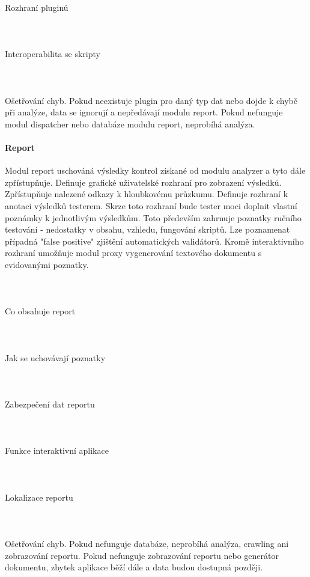 \documentclass[10pt]{article}
\begin{document}
	\paragraph{~}Rozhraní pluginů
	\paragraph{~}Interoperabilita se skripty
	\paragraph{~}Ošetřování chyb. Pokud neexistuje plugin pro daný typ dat nebo dojde k chybě při analýze, data se ignorují a nepředávají modulu report. Pokud nefunguje modul dispatcher nebo databáze modulu report, neprobíhá analýza.
	\paragraph{Report} Modul report uschováná výsledky kontrol získané od modulu analyzer a tyto dále zpřístupňuje. Definuje grafické uživatelské rozhraní pro zobrazení výsledků. Zpřístupňuje nalezené odkazy k hloubkovému průzkumu. Definuje rozhraní k anotaci výsledků testerem. Skrze toto rozhraní bude tester moci doplnit vlastní poznámky k jednotlivým výsledkům. Toto především zahrnuje poznatky ručního testování - nedostatky v obsahu, vzhledu, fungování skriptů. Lze poznamenat případná "false positive" zjištění automatických validátorů. Kromě interaktivního rozhraní umožňuje modul proxy vygenerování textového dokumentu s evidovanými poznatky. 
	\paragraph{~}Co obsahuje report
	\paragraph{~}Jak se uchovávají poznatky
	\paragraph{~}Zabezpečení dat reportu
	\paragraph{~}Funkce interaktivní aplikace
	\paragraph{~}Lokalizace reportu
	\paragraph{~}Ošetřování chyb. Pokud nefunguje databáze, neprobíhá analýza, crawling ani zobrazování reportu. Pokud nefunguje zobrazování reportu nebo generátor dokumentu, zbytek aplikace běží dále a data budou dostupná později.
\end{document}
